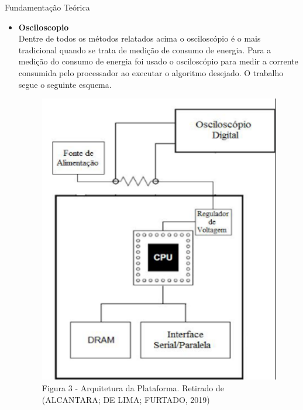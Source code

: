 \documentclass{IFES-beamer}
\begin{document}
\begin{frame}{Fundamentação Teórica}
\begin{itemize}
    \item \textbf{Osciloscopio}\\ Dentre de todos os métodos relatados acima o osciloscópio é o mais tradicional quando se trata de medição de consumo de energia. Para a medição do consumo de energia foi usado o osciloscópio para medir a corrente consumida pelo processador ao executar o algoritmo desejado. O trabalho segue o seguinte esquema.
\begin{figure}
    \centering
    \includegraphics[scale=0.5]{images/ociloscopio.png}
    \caption{Figura 3 - Arquitetura da Plataforma. Retirado de (ALCANTARA; DE LIMA; FURTADO, 2019)}
    
\end{figure}
\end{itemize}   
\end{frame}
\end{document}
